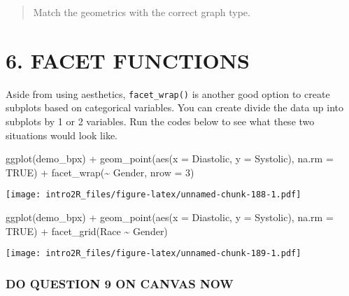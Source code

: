 \documentclass[
]{book}
\newenvironment{Shaded}{\begin{snugshade}}{\end{snugshade}}
\newcommand{\AttributeTok}[1]{\textcolor[rgb]{0.77,0.63,0.00}{#1}}
\newcommand{\ConstantTok}[1]{\textcolor[rgb]{0.00,0.00,0.00}{#1}}
\newcommand{\DecValTok}[1]{\textcolor[rgb]{0.00,0.00,0.81}{#1}}
\newcommand{\FunctionTok}[1]{\textcolor[rgb]{0.00,0.00,0.00}{#1}}
\newcommand{\NormalTok}[1]{#1}
\newcommand{\SpecialCharTok}[1]{\textcolor[rgb]{0.00,0.00,0.00}{#1}}
\begin{document}
\begin{quote}
Match the geometrics with the correct graph type.
\end{quote}

\hypertarget{facet-functions}{%
\section{6. FACET FUNCTIONS}\label{facet-functions}}

Aside from using aesthetics, \texttt{facet\_wrap()} is another good option to create subplots based on categorical variables. You can create divide the data up into subplots by 1 or 2 variables. Run the codes below to see what these two situations would look like.

\begin{Shaded}
\begin{Highlighting}[]
\FunctionTok{ggplot}\NormalTok{(demo\_bpx) }\SpecialCharTok{+}
  \FunctionTok{geom\_point}\NormalTok{(}\FunctionTok{aes}\NormalTok{(}\AttributeTok{x =}\NormalTok{ Diastolic, }\AttributeTok{y =}\NormalTok{ Systolic), }\AttributeTok{na.rm =} \ConstantTok{TRUE}\NormalTok{) }\SpecialCharTok{+}
  \FunctionTok{facet\_wrap}\NormalTok{(}\SpecialCharTok{\textasciitilde{}}\NormalTok{ Gender, }\AttributeTok{nrow =} \DecValTok{3}\NormalTok{)}
\end{Highlighting}
\end{Shaded}

\texttt{[image: intro2R\_files/figure-latex/unnamed-chunk-188-1.pdf]}

\begin{Shaded}
\begin{Highlighting}[]
\FunctionTok{ggplot}\NormalTok{(demo\_bpx) }\SpecialCharTok{+}
  \FunctionTok{geom\_point}\NormalTok{(}\FunctionTok{aes}\NormalTok{(}\AttributeTok{x =}\NormalTok{ Diastolic, }\AttributeTok{y =}\NormalTok{ Systolic), }\AttributeTok{na.rm =} \ConstantTok{TRUE}\NormalTok{) }\SpecialCharTok{+}
  \FunctionTok{facet\_grid}\NormalTok{(Race }\SpecialCharTok{\textasciitilde{}}\NormalTok{ Gender)}
\end{Highlighting}
\end{Shaded}

\texttt{[image: intro2R\_files/figure-latex/unnamed-chunk-189-1.pdf]}

\hypertarget{do-question-9-on-canvas-now}{%
\subsubsection{DO QUESTION 9 ON CANVAS NOW}\label{do-question-9-on-canvas-now}}
\end{document}

